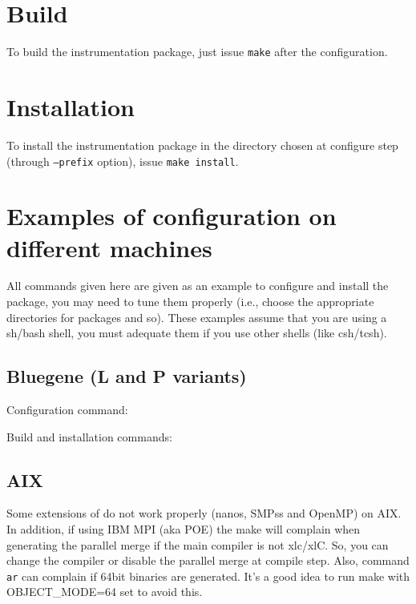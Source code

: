 \section{Build}

To build the instrumentation package, just issue {\tt make} after the configuration.

\section{Installation}

To install the instrumentation package in the directory chosen at configure step (through {\tt --prefix} option), issue {\tt make install}.

\section{Examples of configuration on different machines}

All commands given here are given as an example to configure and install the package, you may need to tune them properly (i.e., choose the appropriate directories for packages and so).  These examples assume that you are using a sh/bash shell, you must adequate them if you use other shells (like csh/tcsh).

\subsection{Bluegene (L and P variants)}

Configuration command:


Build and installation commands:


\subsection{AIX}

Some extensions of \TRACE do not work properly (nanos, SMPss and OpenMP) on AIX. In addition, if using IBM MPI (aka POE) the make will complain when generating the parallel merge if the main compiler is not xlc/xlC. So, you can change the compiler or disable the parallel merge at compile step. Also, command {\tt ar} can complain if 64bit binaries are generated. It's a good idea to run make with OBJECT\_MODE=64 set to avoid this.

